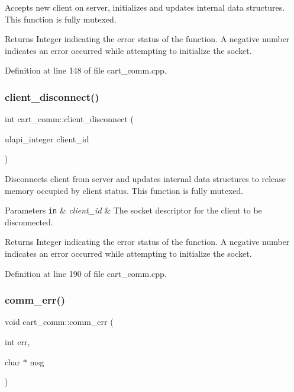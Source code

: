 Accepts new client on server, initializes and updates internal data structures. This function is fully mutexed. \begin{DoxyReturn}{Returns}
Integer indicating the error status of the function. A negative number indicates an error occurred while attempting to initialize the socket. 
\end{DoxyReturn}


Definition at line 148 of file cart\+\_\+comm.\+cpp.

\mbox{\label{classcart__comm_acde9fbf68884955ccfd94a907add2396}} 
\subsubsection{\texorpdfstring{client\+\_\+disconnect()}{client\_disconnect()}}
{\footnotesize\ttfamily int cart\+\_\+comm\+::client\+\_\+disconnect (\begin{DoxyParamCaption}\item[{ulapi\+\_\+integer}]{client\+\_\+id }\end{DoxyParamCaption})}

Disconnects client from server and updates internal data structures to release memory occupied by client status. This function is fully mutexed. 
\begin{DoxyParams}[1]{Parameters}
\mbox{\tt in}  & {\em client\+\_\+id} & The socket descriptor for the client to be disconnected. \\
\hline
\end{DoxyParams}
\begin{DoxyReturn}{Returns}
Integer indicating the error status of the function. A negative number indicates an error occurred while attempting to initialize the socket. 
\end{DoxyReturn}


Definition at line 190 of file cart\+\_\+comm.\+cpp.

\mbox{\label{classcart__comm_a6ccdb437e38073d80fd3a12163a954c4}} 
\subsubsection{\texorpdfstring{comm\+\_\+err()}{comm\_err()}}
{\footnotesize\ttfamily void cart\+\_\+comm\+::comm\+\_\+err (\begin{DoxyParamCaption}\item[{int}]{err,  }\item[{char $\ast$}]{msg }\end{DoxyParamCaption})\hspace{0.3cm}{\ttfamily [private]}}

